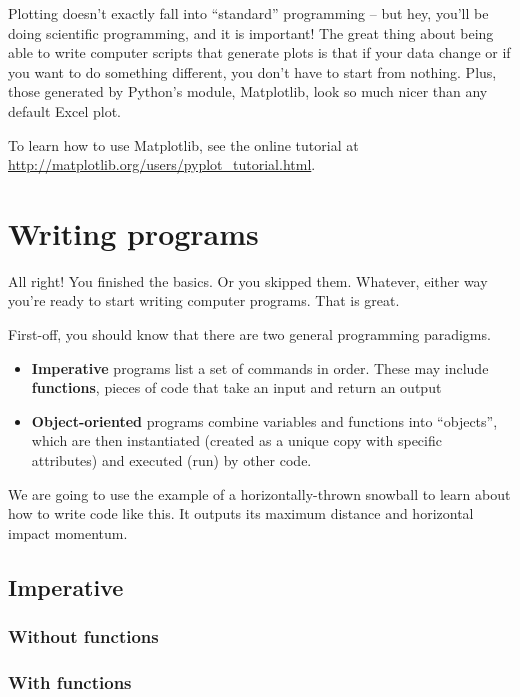 \documentclass[a4paper,10pt]{scrartcl}
\begin{document}
Plotting doesn't exactly fall into ``standard'' programming -- but hey, you'll be doing scientific programming, and it is important! The great thing about being able to write computer scripts that generate plots is that if your data change or if you want to do something different, you don't have to start from nothing. Plus, those generated by Python's module, Matplotlib, look so much nicer than any default Excel plot.

To learn how to use Matplotlib, see the online tutorial at \url{http://matplotlib.org/users/pyplot_tutorial.html}.

\section{Writing programs}

All right! You finished the basics. Or you skipped them. Whatever, either way you're ready to start writing computer programs. That is great.

First-off, you should know that there are two general programming paradigms.
\begin{itemize}
 \item \textbf{Imperative} programs list a set of commands in order. These may include \textbf{functions}, pieces of code that take an input and return an output
 \item \textbf{Object-oriented} programs combine variables and functions into ``objects'', which are then instantiated (created as a unique copy with specific attributes) and executed (run) by other code.
\end{itemize}

We are going to use the example of a horizontally-thrown snowball to learn about how to write code like this. It outputs its maximum distance and horizontal impact momentum.

\subsection{Imperative}

\subsubsection{Without functions}



\subsubsection{With functions}
\end{document}
